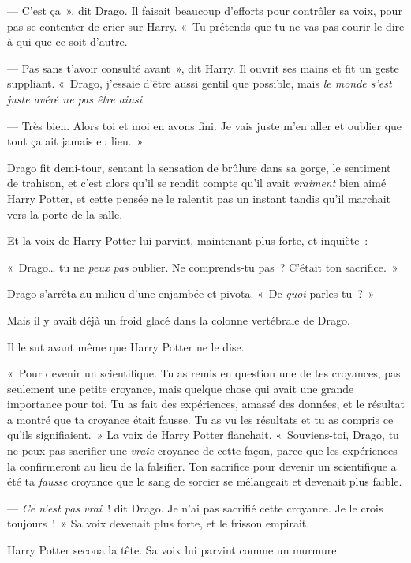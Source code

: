 --- C'est ça~», dit Drago.
Il faisait beaucoup d'efforts pour contrôler sa voix, pour pas se contenter de crier sur Harry.
«~Tu prétends que tu ne vas pas courir le dire à qui que ce soit d'autre.

--- Pas sans t'avoir consulté avant~», dit Harry.
Il ouvrit ses mains et fit un geste suppliant.
«~Drago, j'essaie d'être aussi gentil que possible, mais \emph{le monde s'est juste avéré ne pas être ainsi.}

--- Très bien.
Alors toi et moi en avons fini.
Je vais juste m'en aller et oublier que tout ça ait jamais eu lieu.~»

Drago fit demi-tour, sentant la sensation de brûlure dans sa gorge, le sentiment de trahison, et c'est alors qu'il se rendit compte qu'il avait \emph{vraiment} bien aimé Harry Potter, et cette pensée ne le ralentit pas un instant tandis qu'il marchait vers la porte de la salle.

Et la voix de Harry Potter lui parvint, maintenant plus forte, et inquiète~:

«~Drago… tu ne \emph{peux pas} oublier.
Ne comprends-tu pas~?
C'était ton sacrifice.~»

Drago s'arrêta au milieu d'une enjambée et pivota.
«~De \emph{quoi} parles-tu~?~»

Mais il y avait déjà un froid glacé dans la colonne vertébrale de Drago.

Il le sut avant même que Harry Potter ne le dise.

«~Pour devenir un scientifique.
Tu as remis en question une de tes croyances, pas seulement une petite croyance, mais quelque chose qui avait une grande importance pour toi.
Tu as fait des expériences, amassé des données, et le résultat a montré que ta croyance était fausse.
Tu as vu les résultats et tu as compris ce qu'ils signifiaient.~»
La voix de Harry Potter flanchait.
«~Souviens-toi, Drago, tu ne peux pas sacrifier une \emph{vraie} croyance de cette façon, parce que les expériences la confirmeront au lieu de la falsifier.
Ton sacrifice pour devenir un scientifique a été ta \emph{fausse} croyance que le sang de sorcier se mélangeait et devenait plus faible.

--- \emph{Ce n'est pas vrai}~! dit Drago.
Je n'ai pas sacrifié cette croyance.
Je le crois toujours~!~»
Sa voix devenait plus forte, et le frisson empirait.

Harry Potter secoua la tête.
Sa voix lui parvint comme un murmure.

